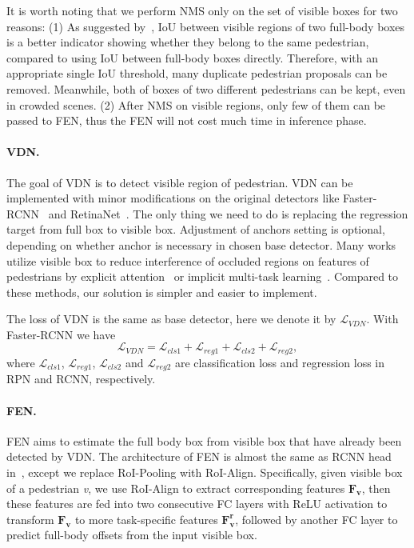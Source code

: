 \documentclass[10pt,twocolumn,letterpaper]{article}
\begin{document}
It is worth noting that we perform NMS only on the set of visible boxes for two reasons: (1) As suggested by~\cite{huang2020R2nms}, IoU between visible regions of two full-body boxes is a better indicator showing whether they belong to the same pedestrian, compared to using IoU between full-body boxes directly. Therefore, with an appropriate single IoU threshold, many duplicate pedestrian proposals can be removed. Meanwhile, both of boxes of two different pedestrians can be kept, even in crowded scenes. (2) After NMS on visible regions, only few of them can be passed to FEN, thus the FEN will not cost much time in inference phase. 

\paragraph{VDN.} The goal of VDN is to detect visible region of pedestrian. VDN can be implemented with minor modifications on the original detectors like Faster-RCNN~\cite{ren2015faster} and RetinaNet~\cite{lin2017focal}. The only thing we need to do is replacing the regression target from full box to visible box. Adjustment of anchors setting is optional, depending on whether anchor is necessary in chosen base detector. Many works utilize visible box to reduce interference of occluded regions on features of pedestrians by explicit attention~\cite{zhang2018occludedattention,pang2019mask} or implicit multi-task learning~\cite{Zhou_2018_bibox}. Compared to these methods, our solution is simpler and easier to implement.

The loss of VDN is the same as base detector, here we denote it by $\mathcal{L}_{VDN}$. With Faster-RCNN we have
\begin{equation}
\mathcal{L}_{VDN} = \mathcal{L}_{cls1}+\mathcal{L}_{reg1}+\mathcal{L}_{cls2}+\mathcal{L}_{reg2},
\label{equ:vdn_loss}
\end{equation}
    where $\mathcal{L}_{cls1}$, $\mathcal{L}_{reg1}$, $\mathcal{L}_{cls2}$ and $\mathcal{L}_{reg2}$ are classification loss and regression loss in RPN and RCNN, respectively.

\paragraph{FEN.} FEN aims to estimate the full body box from visible box that have already been detected by VDN. The architecture of FEN is almost the same as RCNN head in~\cite{ren2015faster}, except we replace RoI-Pooling with RoI-Align. Specifically, given visible box of a pedestrian \textit{v}, we use RoI-Align to extract corresponding features $\bm{F_v}$, then these features are fed into two consecutive FC layers with ReLU activation to transform $\bm{F_v}$ to more task-specific features $\bm{F_v^r}$, followed by another FC layer to predict full-body offsets from the input visible box.
\end{document}

